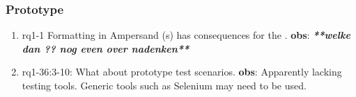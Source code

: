 \subsubsection{Prototype}
\begin{comment}
plaats hier de afgehandelde items.
\end{comment}
\begin{enumerate}
    \item rq1-1 Formatting in Ampersand (s) has consequences for the .
    \newline\textbf{obs}: \textbf{\textit{**welke dan ?? nog even over nadenken**}}
    
    \item rq1-36:3-10: What about prototype test scenarios.
    \newline\textbf{obs}: Apparently lacking testing tools.
    Generic tools such as Selenium may need to be used.
     
\end{enumerate}

